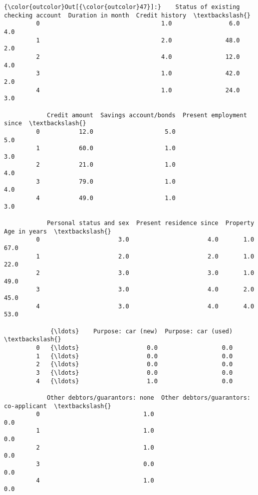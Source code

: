 \documentclass[11pt]{article}
\begin{document}
            \begin{Verbatim}[commandchars=\\\{\}]
{\color{outcolor}Out[{\color{outcolor}47}]:}    Status of existing checking account  Duration in month  Credit history  \textbackslash{}
         0                                  1.0                6.0             4.0   
         1                                  2.0               48.0             2.0   
         2                                  4.0               12.0             4.0   
         3                                  1.0               42.0             2.0   
         4                                  1.0               24.0             3.0   
         
            Credit amount  Savings account/bonds  Present employment since  \textbackslash{}
         0           12.0                    5.0                       5.0   
         1           60.0                    1.0                       3.0   
         2           21.0                    1.0                       4.0   
         3           79.0                    1.0                       4.0   
         4           49.0                    1.0                       3.0   
         
            Personal status and sex  Present residence since  Property  Age in years  \textbackslash{}
         0                      3.0                      4.0       1.0          67.0   
         1                      2.0                      2.0       1.0          22.0   
         2                      3.0                      3.0       1.0          49.0   
         3                      3.0                      4.0       2.0          45.0   
         4                      3.0                      4.0       4.0          53.0   
         
             {\ldots}    Purpose: car (new)  Purpose: car (used)  \textbackslash{}
         0   {\ldots}                   0.0                  0.0   
         1   {\ldots}                   0.0                  0.0   
         2   {\ldots}                   0.0                  0.0   
         3   {\ldots}                   0.0                  0.0   
         4   {\ldots}                   1.0                  0.0   
         
            Other debtors/guarantors: none  Other debtors/guarantors: co-applicant  \textbackslash{}
         0                             1.0                                     0.0   
         1                             1.0                                     0.0   
         2                             1.0                                     0.0   
         3                             0.0                                     0.0   
         4                             1.0                                     0.0   
         

\end{Verbatim}
\end{document}
